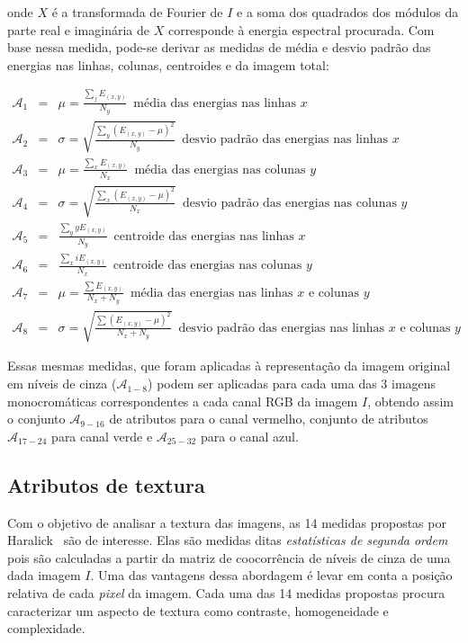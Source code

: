 \noindent onde $X$ é a transformada de Fourier de $I$ e a soma dos quadrados dos
módulos da parte real e imaginária de $X$ corresponde à energia espectral
procurada. Com base nessa medida, pode-se derivar as medidas de média e desvio
padrão das energias nas linhas, colunas, centroides e da imagem total:

\begin{eqnarray}
  \mathcal{A}_1 &=& \mu = \frac{\sum_j E_{(x,y)}}{N_y} \, \, \, \text{média das energias
    nas linhas $x$} \\
  \mathcal{A}_2 &=& \sigma = \sqrt{\frac{\sum_y (E_{(x,y)} - \mu)^2}{N_y}} \, \, \,
  \text{desvio padrão das energias nas linhas $x$} \\
  \mathcal{A}_3 &=& \mu = \frac{\sum_x E_{(x,y)}}{N_x} \, \, \, \text{média das energias
    nas colunas $y$} \\
  \mathcal{A}_4 &=& \sigma = \sqrt{\frac{\sum_x (E_{(x,y)} - \mu)^2}{N_x}} \, \, \,
  \text{desvio padrão das energias nas colunas $y$} \\
  \mathcal{A}_5 &=& \frac{\sum_y y E_{(x,y)}}{N_y} \, \, \, \text{centroide das energias
    nas linhas $x$} \\
  \mathcal{A}_6 &=& \frac{\sum_x i E_{(x,y)}}{N_x} \, \, \, \text{centroide das energias
    nas colunas $y$} \\
  \mathcal{A}_7 &=& \mu = \frac{\sum E_{(x,y)}}{N_x + N_y} \, \, \, \text{média das energias
    nas linhas $x$ e colunas $y$} \\
  \mathcal{A}_8 &=& \sigma = \sqrt{\frac{\sum (E_{(x,y)} - \mu)^2}{N_x + N_y}} \, \, \,
  \text{desvio padrão das energias nas linhas $x$ e colunas $y$}
\end{eqnarray}

Essas mesmas medidas, que foram aplicadas à representação da imagem
original em níveis de cinza ($\mathcal{A}_{1-8}$) podem ser aplicadas
para cada uma das 3 imagens monocromáticas correspondentes a cada
canal RGB da imagem $I$, obtendo assim o conjunto $\mathcal{A}_{9-16}$
de atributos para o canal vermelho, conjunto de atributos
$\mathcal{A}_{17-24}$ para canal verde e $\mathcal{A}_{25-32}$ para o
canal azul.

\subsection{Atributos de textura}

Com o objetivo de analisar a textura das imagens, as 14 medidas
propostas por Haralick~\cite{haralick} são de interesse. Elas são
medidas ditas \emph{estatísticas de segunda ordem} pois são calculadas
a partir da matriz de coocorrência de níveis de cinza de uma dada
imagem $I$. Uma das vantagens dessa abordagem é levar em conta a
posição relativa de cada \textit{pixel} da imagem. Cada uma das 14 medidas
propostas procura caracterizar um aspecto de textura como contraste,
homogeneidade e complexidade.

